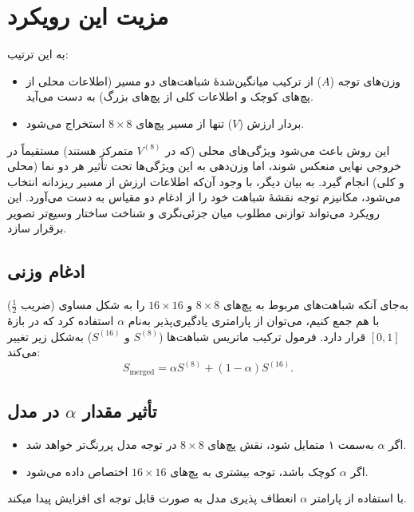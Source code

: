 \section*{مزیت این رویکرد}

به این ترتیب:
\begin{itemize}
	\item وزن‌های توجه (\(A\)) از ترکیب میانگین‌شدهٔ شباهت‌های دو مسیر (اطلاعات محلی از پچ‌های کوچک و اطلاعات کلی از پچ‌های بزرگ) به دست می‌آید.
	\item بردار ارزش (\(V\)) تنها از مسیر پچ‌های \(8 \times 8\) استخراج می‌شود.
\end{itemize}

این روش باعث می‌شود ویژگی‌های محلی (که در \(V^{(8)}\) متمرکز هستند) مستقیماً در خروجی نهایی منعکس شوند، اما وزن‌دهی به این ویژگی‌ها تحت تأثیر هر دو نما (محلی و کلی) انجام گیرد. به بیان دیگر، با وجود آن‌که اطلاعات ارزش از مسیر ریزدانه انتخاب می‌شود، مکانیزم توجه نقشهٔ شباهت خود را از ادغام دو مقیاس به دست می‌آورد. این رویکرد می‌تواند توازنی مطلوب میان جزئی‌نگری و شناخت ساختار وسیع‌تر تصویر برقرار سازد.

\subsection{ادغام وزنی}



به‌جای آنکه شباهت‌های مربوط به پچ‌های \(8 \times 8\) و \(16 \times 16\) را به شکل مساوی (ضریب \(\frac{1}{2}\)) با هم جمع کنیم، می‌توان از پارامتری یادگیری‌پذیر  به‌نام \(\alpha\) استفاده کرد که در بازهٔ \([0, 1]\) قرار دارد. فرمول ترکیب ماتریس شباهت‌ها (\(S^{(8)}\) و \(S^{(16)}\)) به‌شکل زیر تغییر می‌کند:
\begin{equation}
	S_{\text{merged}} = \alpha S^{(8)} + (1 - \alpha) S^{(16)}.
\end{equation}


\subsection*{تأثیر مقدار \(\alpha\) در مدل}
\begin{itemize}
	\item اگر \(\alpha\) به‌سمت ۱ متمایل شود، نقش پچ‌های \(8 \times 8\) در توجه مدل پررنگ‌تر خواهد شد.
	\item اگر \(\alpha\) کوچک باشد، توجه بیشتری به پچ‌های \(16 \times 16\) اختصاص داده می‌شود.
\end{itemize}

با استفاده از پارامتر \(\alpha\) انعطاف پذیری مدل به صورت قابل توجه ای افزایش پیدا میکند.

